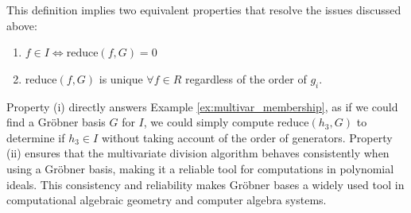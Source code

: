 This definition implies two equivalent properties that resolve the issues discussed above:
\begin{center}
    \begin{varwidth}{\textwidth}
        \begin{enumerate}[label=(\roman*), font=\itshape]
            \item $f \in I \iff \text{reduce}(f, G) = 0$
            \item $\text{reduce}(f, G)$ is unique $\forall f \in R$ regardless of the order of $g_i$.
        \end{enumerate}
    \end{varwidth}
\end{center}

Property (i) directly answers Example \ref{ex:multivar_membership}, as if we could find a Gröbner basis $G$ for $I$, we could simply compute $\text{reduce}(h_3, G)$ to determine if $h_3 \in I$ without taking account of the order of generators. Property (ii) ensures that the multivariate division algorithm behaves consistently when using a Gröbner basis, making it a reliable tool for computations in polynomial ideals. This consistency and reliability makes Gröbner bases a widely used tool in computational algebraic geometry and computer algebra systems.